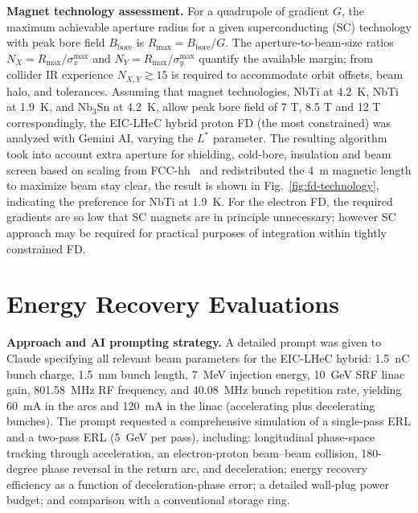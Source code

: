 \documentclass[%
               refpage,       %
               biblatex,     %
               hyphens,      %
               ]{jacow}
\begin{document}
  \textbf{Magnet technology assessment.}     
For a quadrupole of gradient $G$, the maximum achievable aperture radius
  for a given superconducting (SC) technology with peak bore field               
  $B_\mathrm{bore}$ is $R_\mathrm{max}=B_\mathrm{bore}/G$.                       
  The aperture-to-beam-size ratios                                               
  $N_X = R_\mathrm{max}/\sigma^\mathrm{max}_x$ and                               
  $N_Y = R_\mathrm{max}/\sigma^\mathrm{max}_y$                                   
  quantify the available margin; from collider IR experience    
  $N_{X,Y}\gtrsim15$ is required to accommodate orbit offsets, beam halo,        
  and tolerances.  
Assuming that magnet technologies, NbTi at 4.2~K, NbTi at 1.9~K, and Nb$_3$Sn at 4.2~K, allow peak bore field of 7 T, 8.5 T and 12 T correspondingly, the EIC-LHeC hybrid proton FD (the most constrained) was analyzed with Gemini AI, varying the $L^*$ parameter. The resulting algorithm took into account extra aperture for shielding, cold-bore, insulation and beam screen based on scaling from FCC-hh~\cite{van_riesen-haupt:ipac18-mopmk007} and redistributed the 4~m magnetic length to maximize beam stay clear, the result is shown in Fig.~\ref{fig:fd-technology}, indicating the preference for NbTi at 1.9~K.     
For the electron FD, the required gradients are so low that SC magnets are in principle unnecessary; however SC approach may be required for practical purposes of integration within tightly constrained FD. 
  



\section{Energy Recovery Evaluations}                                      
                                                                             
  \textbf{Approach and AI prompting strategy.}                               
  A detailed prompt was given to Claude specifying all relevant beam         
  parameters                                                                 
  for the EIC-LHeC hybrid: 1.5~nC bunch charge, 1.5~mm bunch length,
  7~MeV injection energy, 10~GeV SRF linac gain, 801.58~MHz RF               
  frequency, and 40.08~MHz bunch repetition rate, yielding 60~mA in the      
  arcs and 120~mA in the linac (accelerating plus decelerating bunches).     
  The prompt requested a comprehensive simulation of a single-pass ERL       
  and a two-pass ERL (5~GeV per pass), including: longitudinal               
  phase-space tracking through acceleration, an electron-proton              
  beam--beam collision, 180-degree phase reversal in the return arc,          
  and deceleration; energy recovery efficiency as a function of              
  deceleration-phase error; a detailed wall-plug power budget; and           
  comparison with a conventional storage ring.     
\end{document}
